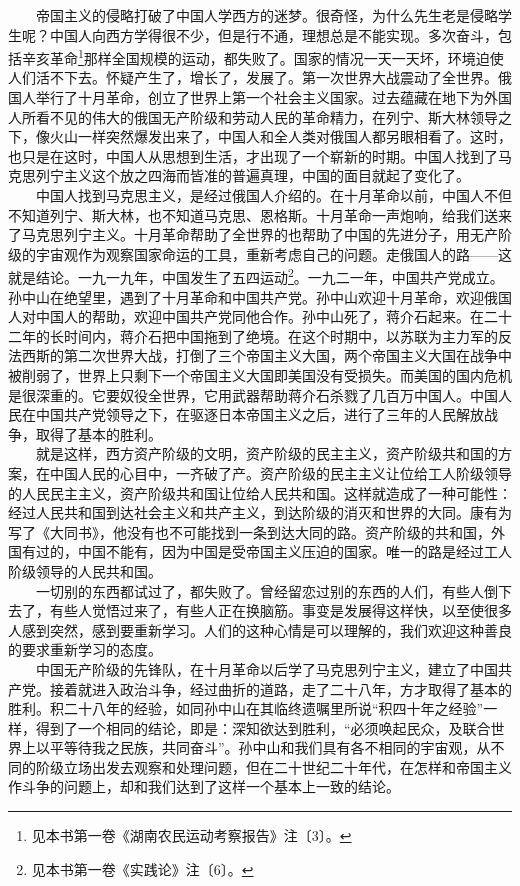 \documentclass[cn,11pt,chinese]{elegantbook}
\begin{document}
　　帝国主义的侵略打破了中国人学西方的迷梦。很奇怪，为什么先生老是侵略学生呢？中国人向西方学得很不少，但是行不通，理想总是不能实现。多次奋斗，包括辛亥革命\footnote[7]{ 见本书第一卷《湖南农民运动考察报告》注〔3〕。}那样全国规模的运动，都失败了。国家的情况一天一天坏，环境迫使人们活不下去。怀疑产生了，增长了，发展了。第一次世界大战震动了全世界。俄国人举行了十月革命，创立了世界上第一个社会主义国家。过去蕴藏在地下为外国人所看不见的伟大的俄国无产阶级和劳动人民的革命精力，在列宁、斯大林领导之下，像火山一样突然爆发出来了，中国人和全人类对俄国人都另眼相看了。这时，也只是在这时，中国人从思想到生活，才出现了一个崭新的时期。中国人找到了马克思列宁主义这个放之四海而皆准的普遍真理，中国的面目就起了变化了。\\
　　中国人找到马克思主义，是经过俄国人介绍的。在十月革命以前，中国人不但不知道列宁、斯大林，也不知道马克思、恩格斯。十月革命一声炮响，给我们送来了马克思列宁主义。十月革命帮助了全世界的也帮助了中国的先进分子，用无产阶级的宇宙观作为观察国家命运的工具，重新考虑自己的问题。走俄国人的路——这就是结论。一九一九年，中国发生了五四运动\footnote[8]{ 见本书第一卷《实践论》注〔6〕。}。一九二一年，中国共产党成立。孙中山在绝望里，遇到了十月革命和中国共产党。孙中山欢迎十月革命，欢迎俄国人对中国人的帮助，欢迎中国共产党同他合作。孙中山死了，蒋介石起来。在二十二年的长时间内，蒋介石把中国拖到了绝境。在这个时期中，以苏联为主力军的反法西斯的第二次世界大战，打倒了三个帝国主义大国，两个帝国主义大国在战争中被削弱了，世界上只剩下一个帝国主义大国即美国没有受损失。而美国的国内危机是很深重的。它要奴役全世界，它用武器帮助蒋介石杀戮了几百万中国人。中国人民在中国共产党领导之下，在驱逐日本帝国主义之后，进行了三年的人民解放战争，取得了基本的胜利。\\
　　就是这样，西方资产阶级的文明，资产阶级的民主主义，资产阶级共和国的方案，在中国人民的心目中，一齐破了产。资产阶级的民主主义让位给工人阶级领导的人民民主主义，资产阶级共和国让位给人民共和国。这样就造成了一种可能性：经过人民共和国到达社会主义和共产主义，到达阶级的消灭和世界的大同。康有为写了《大同书》，他没有也不可能找到一条到达大同的路。资产阶级的共和国，外国有过的，中国不能有，因为中国是受帝国主义压迫的国家。唯一的路是经过工人阶级领导的人民共和国。\\
　　一切别的东西都试过了，都失败了。曾经留恋过别的东西的人们，有些人倒下去了，有些人觉悟过来了，有些人正在换脑筋。事变是发展得这样快，以至使很多人感到突然，感到要重新学习。人们的这种心情是可以理解的，我们欢迎这种善良的要求重新学习的态度。\\
　　中国无产阶级的先锋队，在十月革命以后学了马克思列宁主义，建立了中国共产党。接着就进入政治斗争，经过曲折的道路，走了二十八年，方才取得了基本的胜利。积二十八年的经验，如同孙中山在其临终遗嘱里所说“积四十年之经验”一样，得到了一个相同的结论，即是：深知欲达到胜利，“必须唤起民众，及联合世界上以平等待我之民族，共同奋斗”。孙中山和我们具有各不相同的宇宙观，从不同的阶级立场出发去观察和处理问题，但在二十世纪二十年代，在怎样和帝国主义作斗争的问题上，却和我们达到了这样一个基本上一致的结论。\\
\end{document}
